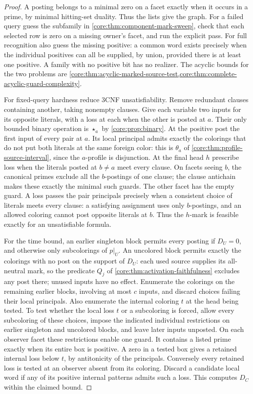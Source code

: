 \begin{proof}
A posting belongs to a minimal zero on a facet exactly when it
occurs in a prime, by minimal hitting-set duality. Thus the lists
give the graph. For a failed query guess the subfamily in
\cref{core:thm:component-mark-sweep}, check that each selected row
is zero on a missing owner's facet, and run the explicit pass.
For full recognition also guess the missing positive: a common word
exists precisely when the individual positives can all be supplied,
by union, provided there is at least one positive. A family with
no positive bit has no realizer. The acyclic bounds for the two
problems are \cref{core:thm:acyclic-marked-source-test,core:thm:complete-acyclic-guard-complexity}.

For fixed-query hardness reduce 3CNF unsatisfiability. Remove
redundant clauses containing another, taking nonempty clauses.
Give each variable two inputs for its opposite literals, with a
loss at each when the other is posted at $a$. Their only bounded
binary operation is $\star_a$ by \cref{core:prop:binary}. At the
positive post the first input of every pair at $a$. Its local
principal admits exactly the colorings that do not put both
literals at the same foreign color: this is $\theta_a$ of
\cref{core:thm:profile-source-interval}, since the $a$-profile is
disjunction. At the final head $h$ prescribe loss when the literals
posted at $b\ne a$ meet every clause. On facets seeing $b$, the
canonical primes exclude all the $b$-postings of one clause;
the clause antichain makes these exactly the minimal such guards.
The other facet has the empty guard. A loss passes the pair
principals precisely when a consistent choice of literals meets
every clause: a satisfying assignment uses only $b$-postings, and
an allowed coloring cannot post opposite literals at $b$. Thus the
$h$-mark is feasible exactly for an unsatisfiable formula.

For the time bound, an earlier singleton block permits every posting
if $D_U=0$, and otherwise only subcolorings of $p|_U$. An uncolored
block permits exactly the colorings with no post on the support of
$D_U$: each used source supplies its all-neutral mark, so the
predicate $Q_j$ of \cref{core:thm:activation-faithfulness} excludes
any post there; unused inputs have no effect. Enumerate the colorings
on the remaining earlier blocks, involving at most $c$ inputs, and
discard choices failing their local principals. Also enumerate the
internal coloring $t$ at the head being tested. To test whether the
local loss $t$ or a subcoloring is forced, allow every subcoloring
of these choices, impose the indicated individual restrictions on
earlier singleton and uncolored blocks, and leave later inputs
unposted. On each observer facet these restrictions enable one
guard. It contains a listed prime exactly when its entire box is
positive. A zero in a tested box gives a retained internal loss
below $t$, by antitonicity of the principals. Conversely every
retained loss is tested at an observer absent from its coloring.
Discard a candidate local word if any of its positive internal
patterns admits such a loss. This computes $D_C$ within the claimed
bound.


\end{proof}
